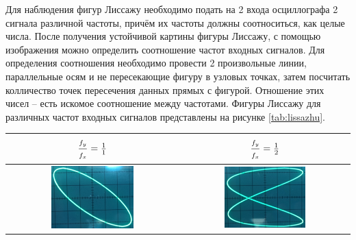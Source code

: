 \documentclass[a4paper,12pt]{article} %
\begin{document}
Для наблюдения фигур Лиссажу необходимо подать на 2 входа осциллографа 2 	сигнала различной частоты, причём их частоты должны соотноситься, как целые числа. После получения устойчивой картины фигуры Лиссажу, с помощью изображения можно определить соотношение частот входных сигналов. Для определения соотношения необходимо провести 2 произвольные линии, параллельные осям и не пересекающие фигуру в узловых точках, затем посчитать колличество точек пересечения данных прямых с фигурой. Отношение этих чисел -- есть искомое соотношение между частотами. Фигуры Лиссажу для различных частот входных сигналов представлены на рисунке \ref{tab:lissazhu}.

\begin{table}[H]
	\centering
	\begin{tabular}{|c|c|}
		\hline
		{\Large $ \frac{f_y\strut }{f_x\strut } = \frac{1}{1}$}	& {\Large $ \frac{f_y\strut }{f_x\strut } = \frac{1}{2}$} \\ \hline
		\includegraphics[width=0.5\textwidth]{liss_1_1.jpg}	& \includegraphics[width=0.5\textwidth]{liss_1_2.jpg}  \\ \hline
	\end{tabular}
\end{table}
\end{document}
